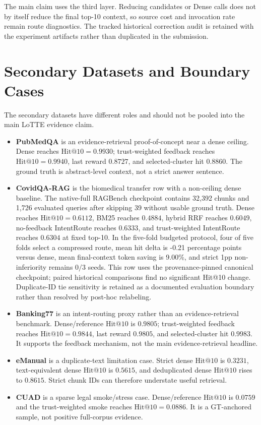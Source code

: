 The main claim uses the third layer. Reducing candidates or Dense calls does not by itself reduce the final top-10 context, so source cost and invocation rate remain route diagnostics. The tracked historical correction audit is retained with the experiment artifacts rather than duplicated in the submission.

\section{Secondary Datasets and Boundary Cases}
\label{sec:12-appendix:secondary-datasets-and-boundary-cases}

The secondary datasets have different roles and should not be pooled into the main LoTTE evidence claim.

\begin{itemize}
\item \textbf{PubMedQA} is an evidence-retrieval proof-of-concept near a dense ceiling. Dense reaches $\mathrm{Hit@10}=0.9930$; trust-weighted feedback reaches $\mathrm{Hit@10}=0.9940$, last reward $0.8727$, and selected-cluster hit $0.8860$. The ground truth is abstract-level context, not a strict answer sentence.
\item \textbf{CovidQA-RAG} is the biomedical transfer row with a non-ceiling dense baseline. The native-full RAGBench checkpoint contains 32,392 chunks and 1,726 evaluated queries after skipping 39 without usable ground truth. Dense reaches $\mathrm{Hit@10}=0.6112$, BM25 reaches $0.4884$, hybrid RRF reaches $0.6049$, no-feedback IntentRoute reaches $0.6333$, and trust-weighted IntentRoute reaches $0.6304$ at fixed top-10. In the five-fold budgeted protocol, four of five folds select a compressed route, mean hit delta is -0.21 percentage points versus dense, mean final-context token saving is 9.00\%, and strict 1pp non-inferiority remains $0/3$ seeds. This row uses the provenance-pinned canonical checkpoint; paired historical comparisons find no significant Hit@10 change. Duplicate-ID tie sensitivity is retained as a documented evaluation boundary rather than resolved by post-hoc relabeling.
\item \textbf{Banking77} is an intent-routing proxy rather than an evidence-retrieval benchmark. Dense/reference $\mathrm{Hit@10}$ is $0.9805$; trust-weighted feedback reaches $\mathrm{Hit@10}=0.9844$, last reward $0.9805$, and selected-cluster hit $0.9983$. It supports the feedback mechanism, not the main evidence-retrieval headline.
\item \textbf{eManual} is a duplicate-text limitation case. Strict dense $\mathrm{Hit@10}$ is $0.3231$, text-equivalent dense $\mathrm{Hit@10}$ is $0.5615$, and deduplicated dense $\mathrm{Hit@10}$ rises to $0.8615$. Strict chunk IDs can therefore understate useful retrieval.
\item \textbf{CUAD} is a sparse legal smoke/stress case. Dense/reference $\mathrm{Hit@10}$ is $0.0759$ and the trust-weighted smoke reaches $\mathrm{Hit@10}=0.0886$. It is a GT-anchored sample, not positive full-corpus evidence.
\end{itemize}

